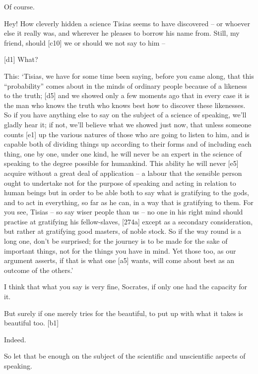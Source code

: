  Of course.

 Hey! How cleverly hidden a science Tisias seems to have
discovered -- or whoever else it really was, and wherever he pleases to
borrow his name from.
Still, my friend, should {[}c10{]} we or should we not say to him --

{[}d1{]}  What?

 This: ‘Tisias, we have for some time been saying, before you
came along, that this “probability” comes about in the minds of ordinary
people because of a likeness to the truth; {[}d5{]} and we showed only a
few moments ago that in every case it is the man who knows the truth who
knows best how to discover these likenesses. So if you have anything
else to say on the subject of a science of speaking, we'll gladly hear
it; if not, we'll believe what we showed just now, that unless someone
counts {[}e1{]} up the various natures of those who are going to listen
to him, and is capable both of dividing
things up according to
their forms and of including each thing, one by one, under one kind, he
will never be an expert in the science of speaking to the degree
possible for humankind. This ability he will never {[}e5{]} acquire
without a great deal of application -- a labour that the sensible person
ought to undertake not for the purpose of speaking and acting in
relation to human beings but in order to be able both to say what is
gratifying to the gods,
and to act in everything, so far as he can, in a way that is gratifying
to them. For you see, Tisias -- so say wiser people than us -- no one in
his right mind should practise at gratifying his fellow-slaves,
{[}274a{]} except as a secondary consideration, but rather at gratifying
good masters, of noble
stock. So if the way
round is a long one, don't be surprised; for the journey is to be made
for the sake of important things, not for the things you have in mind.
Yet those too, as our argument asserts, if that is what one {[}a5{]}
wants, will come about best as an outcome of the
others.'

 I think that what you say is very fine, Socrates, if only one
had the capacity for it.

 But surely if one merely tries for the
beautiful, to put up
with what it takes is beautiful too. {[}b1{]}

 Indeed.

 So let that be enough on the subject of the scientific and
unscientific aspects of speaking.

